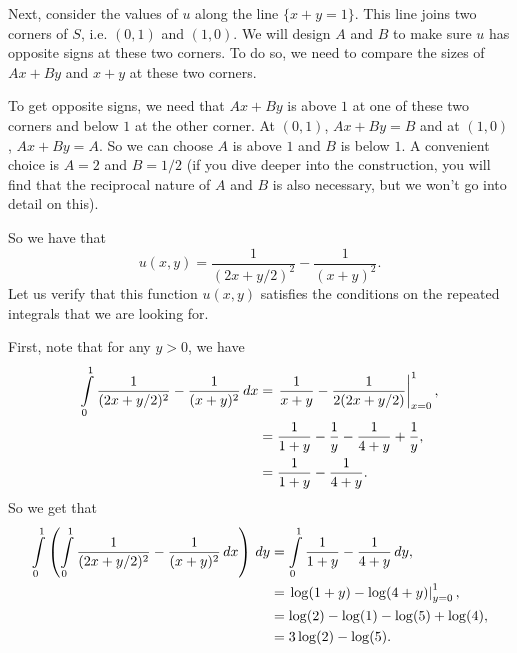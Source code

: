 Next, consider the values of \(u\) along the line \(\{x + y = 1\}\). This line joins two corners of \(S\), i.e. \((0,1)\) and \((1,0)\). We will design \(A\) and \(B\) to make
sure \(u\) has opposite signs at these two corners. To do so, we need to compare the sizes of \(Ax + By\) and \(x + y\) at these two corners.

To get opposite signs, we need that \(Ax + By\) is above \(1\) at one of these two corners and below \(1\) at the other corner. At \((0,1)\), \(Ax + By = B\) and at \((1,0)\), \(Ax + By = A\).
So we can choose \(A\) is above \(1\) and \(B\) is below \(1\). A convenient choice is \(A = 2\) and \(B = 1/2\) (if you dive deeper into the construction, you will find that the reciprocal nature of \(A\) and \(B\) is also necessary, but we won't go into detail on this). 

So we have that
\begin{equation}
u(x,y) = \frac{1}{(2x + y/2)^2} - \frac{1}{(x+y)^2}.
\end{equation}
Let us verify that this function \(u(x,y)\) satisfies the conditions on the repeated integrals that we are looking for.

First, note that for any \(y > 0\), we have
\begin{align}
\int\limits_0^1 \frac{1}{(2x + y/2)^2} - \frac{1}{(x+y)^2} \, dx & = \left.\frac{1}{x+y} - \frac{1}{2(2x + y/2)}\right|^1_{x = 0}, \\ 
    & = \frac{1}{1 + y} - \frac{1}{y} - \frac{1}{4+y} + \frac{1}{y}, \\
    & = \frac{1}{1+y} - \frac{1}{4+y}.
\end{align}
So we get that
\begin{align}
\int\limits_0^1 \left(\int\limits_0^1 \frac{1}{(2x + y/2)^2} - \frac{1}{(x+y)^2} \, dx\right) \, dy & = \int\limits_0^1 \frac{1}{1+y} - \frac{1}{4 + y} \, dy, \\
    & = \left. \log(1 +y) - \log(4 + y)\right|_{y = 0}^1, \\
    & = \log(2) - \log(1) - \log(5) + \log(4), \\
    & = 3\log(2) - \log(5). 
\end{align}

